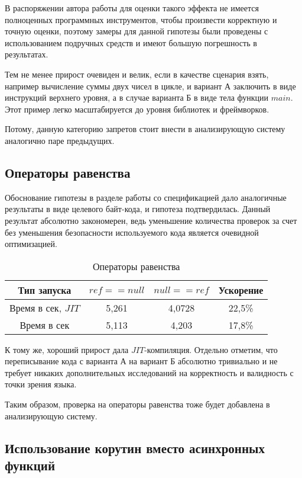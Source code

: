 \documentclass{mipt-thesis-bs}
\begin{document}
В распоряжении автора работы для оценки такого эффекта не имеется полноценных
программных инструментов, чтобы произвести корректную и точную оценки,
поэтому замеры для данной гипотезы были проведены с использованием подручных средств
и имеют большую погрешность в результатах.

Тем не менее прирост очевиден и велик, если в качестве сценария взять, например
вычисление суммы двух чисел в цикле, и вариант А заключить в виде инструкций верхнего
уровня, а в случае варианта Б в виде тела функции $main$. Этот пример легко
масштабируется до уровня библиотек и фреймворков.

Потому, данную категорию запретов стоит внести в анализирующую систему аналогично
паре предыдущих.


\subsection{Операторы равенства}

Обоснование гипотезы в разделе работы со спецификацией дало аналогичные
результаты в виде целевого байт-кода, и гипотеза подтвердилась. Данный результат
абсолютно закономерен, ведь уменьшение количества проверок за счет без уменьшения
безопасности используемого кода является очевидной оптимизацией.

\begin{table}[h]
    \centering
    \begin{tabular}{|c|c|c|c|}
      \hline
      Тип запуска & $ref == null$ & $null == ref$ & Ускорение \\
      \hline
      Время в сек, $JIT$ & 5,261 & 4,0728 & 22,5\% \\
      \hline
      Время в сек & 5,113 & 4,203 & 17,8\% \\
      \hline
    \end{tabular}
    \caption{Операторы равенства}
  \end{table}

К тому же, хороший прирост дала $JIT$-компиляция. Отдельно отметим, что переписывание
кода с варианта А на вариант Б абсолютно тривиально и не требует никаких дополнительных
исследований на корректность и валидность с точки зрения языка.

Таким образом, проверка
на операторы равенства тоже будет добавлена в анализирующую систему.

\subsection{Использование корутин вместо асинхронных функций}
\end{document}
